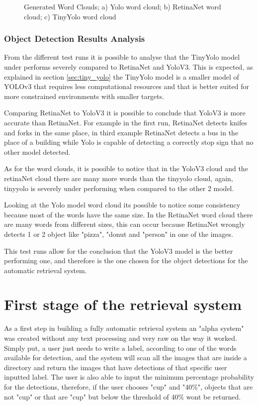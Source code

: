 \begin{figure}[H]
\begin{subfigure}{0.3\textwidth}
      \caption{}
      \end{subfigure}
      \caption{Generated Word Clouds; a) Yolo word cloud; b) RetinaNet word cloud; c) TinyYolo word cloud}
    \end{figure}

    \newpage
    

    \subsubsection{Object Detection Results Analysis}
      \label{sec:results_objet}


     From the different test runs it is possible to analyse that the TinyYolo model under performs severely compared to RetinaNet and YoloV3. This is expected, as explained in section \ref{sec:tiny_yolo} the TinyYolo model is a smaller model of YOLOv3 that requires less computational resources and that is better suited for more constrained environments with smaller targets.

     Comparing RetinaNet to YoloV3 it is possible to conclude that YoloV3 is more accurate than RetinaNet. For example in the first run, RetinaNet detects knifes and forks in the same place, in third example RetinaNet detects a bus in the place of a building while Yolo is capable of detecting a correctly stop sign that no other model detected.

     As for the word clouds, it is possible to notice that in the YoloV3 cloud and the retinaNet cloud there are many more words than the tinyyolo cloud, again, tinyyolo is severely under performing when compared to the other 2 model.
     
     Looking at the Yolo model word cloud its possible to notice some consistency because most of the words have the same size. In the RetinaNet word cloud there are many words from different sizes, this can occur because RetinaNet wrongly detects 1 or 2 object like "pizza", "donut and "person" in one of the images.

     This test runs allow for the conclusion that the YoloV3 model is the better performing one, and therefore is the one chosen for the object detections for the automatic retrieval system. 


\section{First stage of the retrieval system}
\label{sec:alpha_retrieval}

As a first step in building a fully automatic retrieval system an "alpha system" was created without any text processing and very raw on the way it worked. Simply put, a user just needs to write a label, according to one of the words available for detection, and the system will scan all the images that are inside a directory and return the images that have detections of that specific user inputted label. The user is also able to input the minimum percentage probability for the detections, therefore, if the user chooses "cup" and "40\%", objects that are not "cup" or that are "cup" but below the threshold of 40\% wont be returned.

